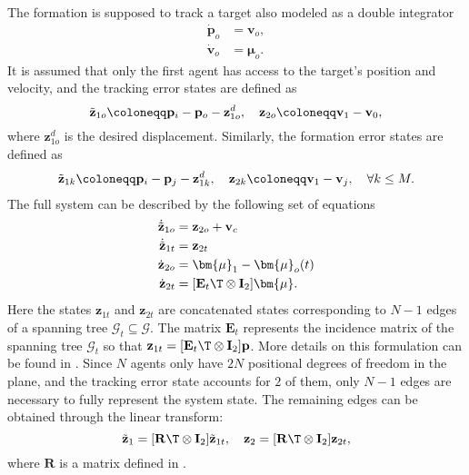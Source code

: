 The formation is supposed to track a target also modeled as a double integrator
\begin{align}
    \dot{\mathbf{p}}_o &= \mathbf{v}_o,\\
    \dot{\mathbf{v}}_o &= \bm{\mu}_o.
\end{align}
It is assumed that only the first agent has access to the target's position and velocity, and the tracking error states are defined as
\begin{equation}
    \Tilde{\mathbf{z}}_{1o} \coloneqq \mathbf{p}_i - \mathbf{p}_o - \mathbf{z}_{1o}^d, \quad \mathbf{z}_{2o} \coloneqq \mathbf{v}_1 - \mathbf{v}_0,
\end{equation}
where $\mathbf{z}_{1o}^d$ is the desired displacement. Similarly, the formation error states are defined as
\begin{align}
    \Tilde{\mathbf{z}}_{1k} \coloneqq \mathbf{p}_i - \mathbf{p}_j - \mathbf{z}_{1k}^d, \quad \mathbf{z}_{2k} \coloneqq \mathbf{v}_1 - \mathbf{v}_j, \quad \forall k \leq M.
\end{align}
The full system can be described by the following set of equations
\begin{subequations}
\begin{align}
    \dot{\tilde{\mathbf{z}}}_{1o} &= \mathbf{z}_{2o} + \mathbf{v}_c\label{eq:restrepo_track_error}\\
    \dot{\tilde{\mathbf{z}}}_{1t} &= \mathbf{z}_{2t}\label{eq:restrepo_formation_error}\\
    \dot{\mathbf{z}}_{2o} &= \bm{\mu}_1-\bm{\mu}_o (t)\\
    \dot{\mathbf{z}}_{2t} &= [\mathbf{E}_t\T \otimes \mathbf{I}_2] \bm{\mu}.
\end{align}
\end{subequations}
Here the states $\mathbf{z}_{1t}$ and $\mathbf{z}_{2t}$ are concatenated states corresponding to $N-1$ edges of a spanning tree $\mathcal{G}_t \subseteq \mathcal{G}$. The matrix $\mathbf{E}_t$ represents the incidence matrix of the spanning tree $\mathcal{G}_t$ so that $\mathbf{z}_{1t} =  [\mathbf{E}_t\T \otimes \mathbf{I}_2] \mathbf{p}$. More details on this formulation can be found in \cite{restrepo_tracking--formation_2022}. Since $N$ agents only have $2N$ positional degrees of freedom in the plane, and the tracking error state accounts for $2$ of them, only $N-1$ edges are necessary to fully represent the system state. The remaining edges can be obtained through the linear transform:
\begin{equation}
    \tilde{\mathbf{z}}_1 = [\mathbf{R}\T \otimes \mathbf{I}_2] \tilde{\mathbf{z}}_{1t}, \quad \mathbf{z}_2 = [\mathbf{R}\T \otimes \mathbf{I}_2] \mathbf{z}_{2t},
\end{equation}
where $\mathbf{R}$ is a matrix defined in \cite{restrepo_tracking--formation_2022}.

